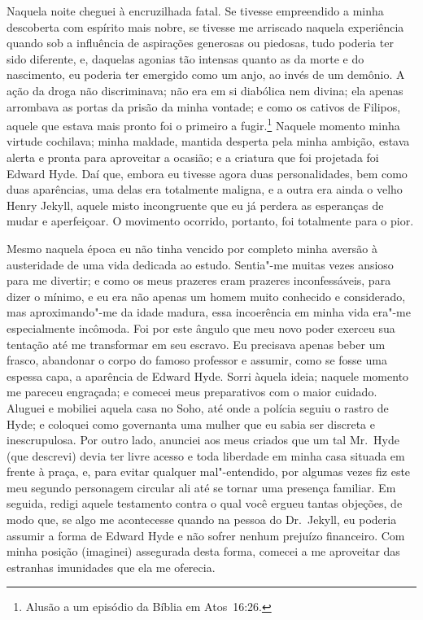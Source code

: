 Naquela noite cheguei à encruzilhada fatal.  Se tivesse empreendido a
minha descoberta com espírito mais nobre, se tivesse me arriscado
naquela experiência quando sob a influência de aspirações generosas ou
piedosas, tudo poderia ter sido diferente, e, daquelas agonias tão
intensas quanto as da morte e do nascimento, eu poderia ter emergido
como um anjo, ao invés de um demônio.  A ação da droga não
discriminava; não era em si diabólica nem divina; ela apenas arrombava
as portas da prisão da minha vontade; e como os cativos de Filipos,
aquele que estava mais pronto foi o primeiro a fugir.\footnote{ Alusão a um episódio da
Bíblia em Atos~16:26.} Naquele momento minha virtude cochilava; minha maldade, mantida
desperta pela minha ambição, estava alerta e pronta para aproveitar a
ocasião; e a criatura que foi projetada foi Edward Hyde.  Daí que,
embora eu tivesse agora duas personalidades, bem como duas aparências,
uma delas era totalmente maligna, e a outra era ainda o velho Henry
Jekyll, aquele misto incongruente que eu já perdera as esperanças de
mudar e aperfeiçoar.  O movimento ocorrido, portanto, foi totalmente
para o pior.

Mesmo naquela época eu não tinha vencido por completo minha aversão à
austeridade de uma vida dedicada ao estudo.  Sentia"-me muitas vezes
ansioso para me divertir; e como os meus prazeres eram prazeres
inconfessáveis, para dizer o mínimo, e eu era não apenas um homem muito
conhecido e considerado, mas aproximando"-me da idade madura, essa
incoerência em minha vida era"-me especialmente incômoda.  Foi por este
ângulo que meu novo poder exerceu sua tentação até me transformar em
seu escravo.  Eu precisava apenas beber um frasco, abandonar o corpo do
famoso professor e assumir, como se fosse uma espessa capa, a aparência
de Edward Hyde.  Sorri àquela ideia; naquele momento me pareceu
engraçada; e comecei meus preparativos com o maior cuidado.  Aluguei e
mobiliei aquela casa no Soho, até onde a polícia seguiu o rastro de Hyde; e
coloquei como governanta uma mulher que eu sabia ser discreta e
inescrupulosa.  Por outro lado, anunciei aos meus criados que um tal
Mr.~Hyde (que descrevi) devia ter livre acesso e toda liberdade em
minha casa situada em frente à praça, e, para evitar qualquer
mal"-entendido, por algumas vezes fiz este meu segundo personagem
circular ali até se tornar uma presença familiar.  Em seguida, redigi
aquele testamento contra o qual você ergueu tantas objeções, de modo
que, se algo me acontecesse quando na pessoa do Dr.~Jekyll, eu poderia
assumir a forma de Edward Hyde e não sofrer nenhum prejuízo financeiro.
 Com minha posição (imaginei) assegurada desta forma, comecei a me
aproveitar das estranhas imunidades que ela me oferecia.

